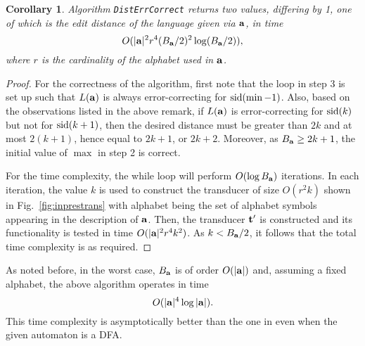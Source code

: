 \documentclass{article}
\theoremstyle{plain}
\newtheorem{corollary}[theorem]{Corollary}
\theoremstyle{definition}
\theoremstyle{remark}
\newcommand\db{B}             \newcommand\dbold{D}   \newcommand\pssi{\par\smallskip\indent}
\newcommand\pnsi{\par\indent}
\begin{document}
\begin{corollary}\label{cor:ec}
Algorithm \texttt{DistErrCorrect} returns
two values, differing by 1, one of which is the edit distance of
the language given via $\mathbf{a}$, in time   $$O(\sz{\aut}^2r^4(\db_{\aut}/2)^2\log(\db_{\aut}/2)),$$
where $r$ is the cardinality of the alphabet used in $\mathbf{a}$.
\end{corollary}
\begin{proof}
For the correctness of the algorithm, first note that the loop in step 3 is set up such that $L(\mathbf{a})$
is always error-correcting for $\mathrm{sid}(\min-1)$. Also, based on the observations listed in the above remark, if $L(\mathbf{a})$ is error-correcting for $\mathrm{sid}(k)$ but not for
$\mathrm{sid}(k+1)$, then the desired distance
must be greater than $2k$ and at most $2(k+1)$, hence equal
to $2k+1$, or $2k+2$. Moreover, as ${\db_\aut}\ge2k+1$,
the initial value of $\max$ in step 2 is correct.
\pnsi
For the time complexity, the while loop will
perform $O(\log {\db_\aut})$ iterations. In each
iteration, the value $k$ is
used to construct the transducer of
size $O(r^2k)$ shown in Fig.~\ref{fig:inprestrans} with alphabet
being the set of alphabet symbols appearing
in the description of $\mathbf{a}$. Then, the transducer
$\mathbf{t}'$ is constructed and its functionality
is tested in time $O(|\mathbf{a}|^2r^4k^2)$.
As $k<{\db_\aut}/2$, it follows that the total time complexity is
as required.
\end{proof}
As noted before, in the worst case, $\db_{\aut}$ is
of order $O(|\mathbf{a}|)$ and, assuming a fixed alphabet, the above algorithm operates in time
$$O(|\mathbf{a}|^4\log|\mathbf{a}|).$$
This time complexity is asymptotically better than the one in \cite{Kon:2007} even when the given automaton is a DFA.
\end{document}
